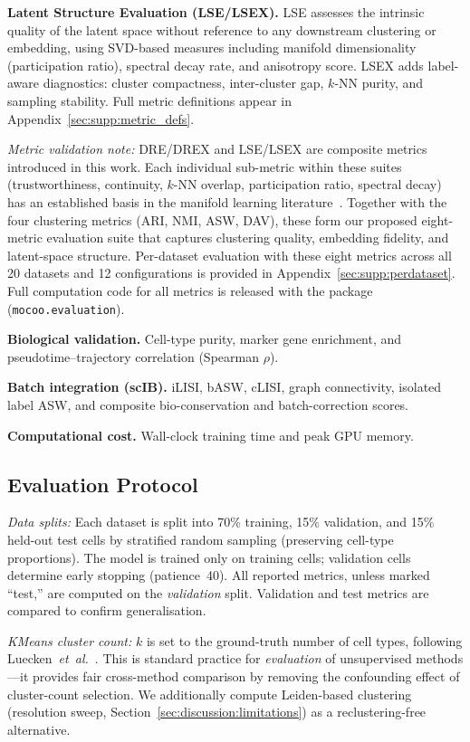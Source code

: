 \documentclass[preprint,12pt,number]{elsarticle}
\begin{document}
\textbf{Latent Structure Evaluation (LSE/LSEX).}
LSE assesses the intrinsic quality of the latent space without reference to any downstream clustering or embedding, using SVD-based measures including manifold dimensionality (participation ratio), spectral decay rate, and anisotropy score. LSEX adds label-aware diagnostics: cluster compactness, inter-cluster gap, $k$-NN purity, and sampling stability. Full metric definitions appear in Appendix~\ref{sec:supp:metric_defs}.

\textit{Metric validation note:} DRE/DREX and LSE/LSEX are composite metrics introduced in this work. Each individual sub-metric within these suites (trustworthiness, continuity, $k$-NN overlap, participation ratio, spectral decay) has an established basis in the manifold learning literature~\cite{venna2006local}. Together with the four clustering metrics (ARI, NMI, ASW, DAV), these form our proposed eight-metric evaluation suite that captures clustering quality, embedding fidelity, and latent-space structure. Per-dataset evaluation with these eight metrics across all 20 datasets and 12 configurations is provided in Appendix~\ref{sec:supp:perdataset}. Full computation code for all metrics is released with the package (\texttt{mocoo.evaluation}).

\textbf{Biological validation.} Cell-type purity, marker gene enrichment, and pseudotime--trajectory correlation (Spearman $\rho$).

\textbf{Batch integration (scIB).} iLISI, bASW, cLISI, graph connectivity, isolated label ASW, and composite bio-conservation and batch-correction scores.

\textbf{Computational cost.} Wall-clock training time and peak GPU memory.

\subsection{Evaluation Protocol}
\label{sec:experiments:protocol}

\textit{Data splits:} Each dataset is split into 70\% training, 15\% validation, and 15\% held-out test cells by stratified random sampling (preserving cell-type proportions). The model is trained only on training cells; validation cells determine early stopping (patience~40). All reported metrics, unless marked ``test,'' are computed on the \textit{validation} split. Validation and test metrics are compared to confirm generalisation.

\textit{KMeans cluster count:} $k$ is set to the ground-truth number of cell types, following Luecken~\textit{et~al.}~\cite{luecken2022scib}. This is standard practice for \textit{evaluation} of unsupervised methods---it provides fair cross-method comparison by removing the confounding effect of cluster-count selection. We additionally compute Leiden-based clustering~\cite{traag2019leiden} (resolution sweep, Section~\ref{sec:discussion:limitations}) as a reclustering-free alternative.
\end{document}
